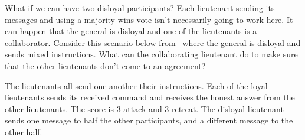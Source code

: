 What if we can have two disloyal participants? Each lieutenant sending its messages and using a majority-wins vote isn't necessarily going to work here. It can happen that the general is disloyal and one of the lieutenants is a collaborator. Consider this scenario below from~\cite{mte241} where the general is disloyal and sends mixed instructions. What can the collaborating lieutenant do to make sure that the other lieutenants don't come to an agreement?

\begin{center}
\end{center}

The lieutenants all send one another their instructions. Each of the loyal lieutenants sends its received command and receives the honest answer from the other lieutenants. The score is 3 attack and 3 retreat. The disloyal lieutenant sends one message to half the other participants, and a different message to the other half.

